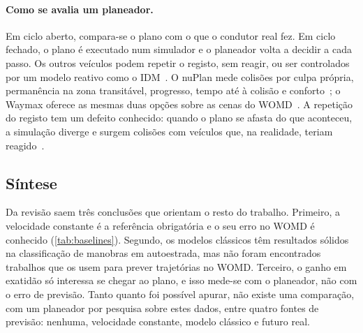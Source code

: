 \paragraph{Como se avalia um planeador.}
Em ciclo aberto, compara-se o plano com o que o condutor real fez. Em
ciclo fechado, o plano é executado num simulador e o planeador volta a
decidir a cada passo. Os outros veículos podem repetir o registo, sem
reagir, ou ser controlados por um modelo reativo como o
IDM~\cite{karnchanachari2024towards}. O nuPlan mede colisões por culpa
própria, permanência na zona transitável, progresso, tempo até à colisão e
conforto~\cite{karnchanachari2024towards}; o Waymax oferece as mesmas
duas opções sobre as cenas do WOMD~\cite{gulino2023waymax}. A repetição
do registo tem um defeito conhecido: quando o plano se afasta do que
aconteceu, a simulação diverge e surgem colisões com veículos que, na
realidade, teriam reagido~\cite{karnchanachari2024towards,hagedorn2025integration}.

\subsection{Síntese}
\label{sec:sintese}

Da revisão saem três conclusões que orientam o resto do trabalho.
Primeiro, a velocidade constante é a referência obrigatória e o seu erro
no WOMD é conhecido (\cref{tab:baselines}). Segundo, os modelos clássicos
têm resultados sólidos na classificação de manobras em autoestrada, mas
não foram encontrados trabalhos que os usem para prever trajetórias no
WOMD. Terceiro, o ganho em exatidão só interessa se chegar ao plano, e
isso mede-se com o planeador, não com o erro de previsão. Tanto quanto
foi possível apurar, não existe uma comparação, com um planeador por
pesquisa sobre estes dados, entre quatro fontes de previsão: nenhuma,
velocidade constante, modelo clássico e futuro real.
